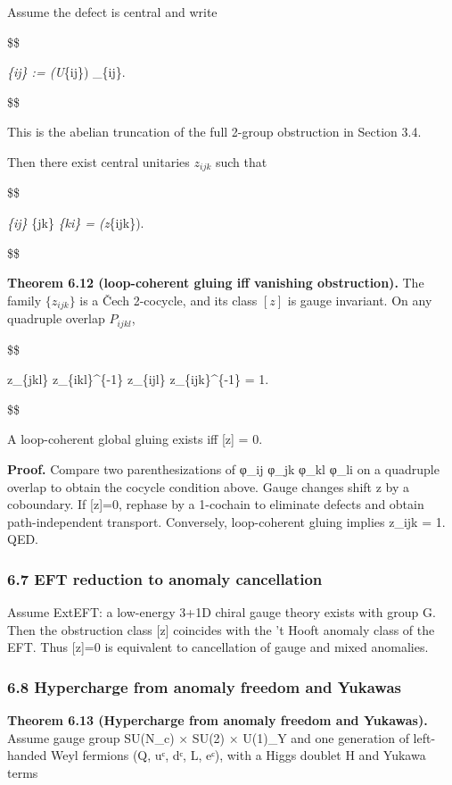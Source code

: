 \documentclass[11pt,a4paper]{article}
\theoremstyle{remark}
\begin{document}
Assume the defect is central and write

\$\$

\varphi\emph{\{ij\} := (U}\{ij\}) \quad {} \_\{ij\}.

\$\$

This is the abelian truncation of the full 2-group obstruction in Section 3.4.

Then there exist central unitaries \(z_{ijk}\) such that

\$\$

\varphi\emph{\{ij\} \varphi}\{jk\} \varphi\emph{\{ki\} = (z}\{ijk\}).

\$\$

\textbf{Theorem 6.12 (loop-coherent gluing iff vanishing obstruction).} The family
\(\{z_{ijk}\}\) is a Čech 2-cocycle, and its class \([z]\) is gauge invariant. On any
quadruple overlap \(P_{ijkl}\),

\$\$

z\_\{jkl\} z\_\{ikl\}\^{}\{-1\} z\_\{ijl\} z\_\{ijk\}\^{}\{-1\} = 1.

\$\$

A loop-coherent global gluing exists iff {[}z{]} = 0.

\textbf{Proof.} Compare two parenthesizations of
φ\_ij φ\_jk φ\_kl φ\_li on a quadruple overlap to
obtain the cocycle condition above. Gauge changes shift z by a coboundary.
If {[}z{]}=0, rephase by a 1-cochain to eliminate defects and obtain
path-independent transport. Conversely, loop-coherent gluing implies
z\_ijk = 1. QED.

\subsubsection{6.7 EFT reduction to anomaly cancellation}\label{eft-reduction-to-anomaly-cancellation}

Assume ExtEFT: a low-energy 3+1D chiral gauge theory exists with group G.
Then the obstruction class {[}z{]} coincides with the 't Hooft anomaly class of
the EFT. Thus {[}z{]}=0 is equivalent to cancellation of gauge and mixed
anomalies.

\subsubsection{6.8 Hypercharge from anomaly freedom and Yukawas}\label{hypercharge-from-anomaly-freedom-and-yukawas}

\textbf{Theorem 6.13 (Hypercharge from anomaly freedom and Yukawas).} Assume gauge
group SU(N\_c) × SU(2) × U(1)\_Y and one generation of left-handed Weyl
fermions (Q, uᶜ, dᶜ, L, eᶜ), with a Higgs doublet H and Yukawa terms
\end{document}
